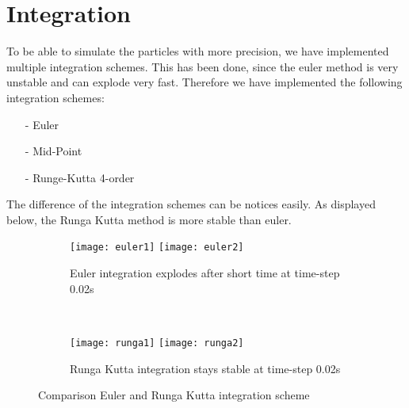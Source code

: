 \section{Integration}
To be able to simulate the particles with more precision, we have implemented multiple integration schemes. This has been done, since the euler method is very unstable and can explode very fast. Therefore we have implemented the following integration schemes:
\begin{itemize}
  \item[-] Euler
  \item[-] Mid-Point
  \item[-] Runge-Kutta 4-order
\end{itemize}
The difference of the integration schemes can be notices easily. As displayed below, the Runga Kutta method is more stable than euler.

\begin{figure}[!htbp]
  \begin{subfigure}[h]{\textwidth}
  \centering
    \texttt{[image: euler1]}
    \texttt{[image: euler2]}
    \caption{Euler integration explodes after short time at time-step 0.02s}
    \label{fig:euler}
  \end{subfigure}
  \\
  \begin{subfigure}[h]{\textwidth}
  \centering
    \texttt{[image: runga1]}
    \texttt{[image: runga2]}
    \caption{Runga Kutta integration stays stable at time-step 0.02s}
    \label{fig:ruga}
  \end{subfigure}
  
  \caption{Comparison Euler and Runga Kutta integration scheme}
  \label{fig:integration}
\end{figure}
